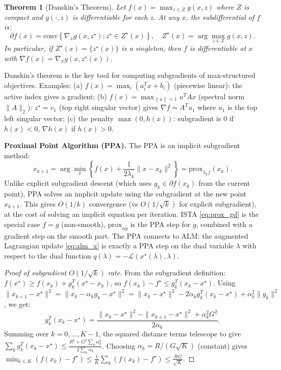 \documentclass[11pt,a4paper]{article}
\newtheorem{theorem}{Theorem}[section]
\theoremstyle{definition}
\begin{document}
\begin{theorem}[Danskin's Theorem]
\label{thm:danskin}
Let $f(x) = \max_{z \in Z} g(x, z)$ where $Z$ is compact and $g(\cdot, z)$ is differentiable for each $z$. At any $x$, the subdifferential of $f$ is:
\begin{equation}
\partial f(x) = \mathrm{conv}\!\left\{\nabla_x g(x, z^{\star}) : z^{\star} \in Z^{\star}(x)\right\}, \quad Z^{\star}(x) = \arg\max_{z \in Z} g(x,z).
\label{eq:danskin}
\end{equation}
In particular, if $Z^{\star}(x) = \{z^{\star}(x)\}$ is a singleton, then $f$ is differentiable at $x$ with $\nabla f(x) = \nabla_x g(x, z^{\star}(x))$.
\end{theorem}

Danskin's theorem is the key tool for computing subgradients of max-structured objectives. Examples: (a) $f(x) = \max_i (a_i^T x + b_i)$ (piecewise linear): the active index gives a gradient; (b) $f(x) = \max_{\|u\|=1} u^T Ax$ (spectral norm $\|A\|_2$): $z^{\star} = v_1$ (top right singular vector) gives $\nabla f = A^T u_1$ where $u_1$ is the top left singular vector; (c) the penalty $\max(0, h(x))$: subgradient is $0$ if $h(x) < 0$, $\nabla h(x)$ if $h(x) > 0$.

\noindent\textbf{Proximal Point Algorithm (PPA).} The PPA is an implicit subgradient method:
\begin{equation}
x_{k+1} = \arg\min_x \left\{f(x) + \frac{1}{2\lambda_k}\|x - x_k\|^2\right\} = \text{prox}_{\lambda_k f}(x_k).
\label{eq:ppa}
\end{equation}
Unlike explicit subgradient descent (which uses $g_k \in \partial f(x_k)$ from the current point), PPA solves an implicit update using the subgradient at the new point $x_{k+1}$. This gives $O(1/k)$ convergence (vs $O(1/\sqrt{k})$ for explicit subgradient), at the cost of solving an implicit equation per iteration. ISTA \eqref{eq:prox_gd} is the special case $f = g$ (non-smooth), $\text{prox}_{\alpha g}$ is the PPA step for $g$, combined with a gradient step on the smooth part. The PPA connects to ALM: the augmented Lagrangian update \eqref{eq:alm_x} is exactly a PPA step on the dual variable $\lambda$ with respect to the dual function $q(\lambda) = -\mathcal{L}(x^{\star}(\lambda), \lambda)$.

\begin{proof}[Proof of subgradient $O(1/\sqrt{k})$ rate]
From the subgradient definition: $f(x^{\star}) \geq f(x_k) + g_k^T(x^{\star} - x_k)$, so $f(x_k) - f^{\star} \leq g_k^T(x_k - x^{\star})$. Using $\|x_{k+1} - x^{\star}\|^2 = \|x_k - \alpha_k g_k - x^{\star}\|^2 = \|x_k - x^{\star}\|^2 - 2\alpha_k g_k^T(x_k - x^{\star}) + \alpha_k^2\|g_k\|^2$, we get:
\[
g_k^T(x_k - x^{\star}) = \frac{\|x_k - x^{\star}\|^2 - \|x_{k+1} - x^{\star}\|^2 + \alpha_k^2 G^2}{2\alpha_k}.
\]
Summing over $k = 0, \ldots, K-1$, the squared distance terms telescope to give $\sum_k g_k^T(x_k - x^{\star}) \leq \frac{R^2 + G^2\sum_k \alpha_k^2}{2\sum_k \alpha_k}$. Choosing $\alpha_k = R/(G\sqrt{K})$ (constant) gives $\min_{k \leq K}(f(x_k) - f^{\star}) \leq \frac{1}{K}\sum_k(f(x_k) - f^{\star}) \leq \frac{RG}{\sqrt{K}}$.
\end{proof}
\end{document}
